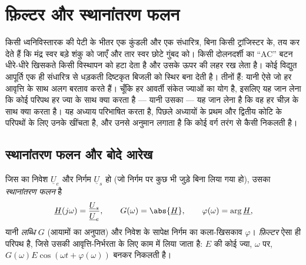 \chapter{फ़िल्टर और स्थानांतरण फलन}\label{ch:b1:filters-transfer-functions}

किसी ध्वनिविस्तारक की पेटी के भीतर एक कुंडली और एक संधारित्र, बिना किसी
ट्रांजिस्टर के, तय कर देते हैं कि मंद्र स्वर बड़े शंकु को जाएँ और तार स्वर छोटे
गुंबद को। किसी दोलनदर्शी का ``AC'' बटन धीरे-धीरे खिसकते किसी विस्थापन को हटा
देता है और उसके ऊपर की लहर रख लेता है। कोई विद्युत आपूर्ति एक ही संधारित्र से
धड़कती दिष्टकृत बिजली को स्थिर  बना देती है। तीनों \emph{} हैं:
यानी ऐसे  जो हर आवृत्ति के साथ अलग बरताव करते हैं। चूँकि हर आवर्ती
संकेत ज्याओं का योग है, इसलिए यह जान लेना कि कोई परिपथ हर ज्या के साथ क्या
करता है --- यानी उसका  --- यह जान लेना है कि वह हर चीज़ के साथ
क्या करता है। यह अध्याय  परिभाषित करता है, पिछले अध्यायों के
प्रथम और द्वितीय कोटि के परिपथों के लिए उनके  खींचता है, और उनसे
अनुमान लगाता है कि कोई वर्ग तरंग  से कैसी निकलती है।

\section{स्थानांतरण फलन और बोदे आरेख}

\begin{definition}\label{def:b1:filters-transfer-functions:H}
जिस  का निवेश  $\underline U_e$ और निर्गम
 $\underline U_s$ हो (जो निर्गम पर कुछ भी जुड़े बिना लिया गया हो), उसका
\emph{स्थानांतरण फलन} है
\[
\underline H(j\omega) = \frac{\underline U_s}{\underline U_e},
\qquad G(\omega) = \abs{\underline H}, \qquad \varphi(\omega) = \arg\underline H,
\]
यानी \emph{लब्धि} $G$ (आयामों का अनुपात) और निवेश के सापेक्ष निर्गम का
कला-खिसकाव $\varphi$। \emph{फ़िल्टर} ऐसा ही परिपथ है, जिसे उसकी
आवृत्ति-निर्भरता के लिए काम में लिया जाता है:  $E$ की कोई ज्या, $\omega$
पर, $G(\omega)E\cos(\omega t + \varphi(\omega))$ बनकर निकलती है।
\end{definition}

